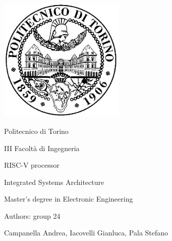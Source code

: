 \documentclass[10pt,  english, makeidx, a4paper, titlepage, oneside]{article}
\begin{document}
	\begin{titlepage}
		\vspace{2cm}
		\centerline{
		\includegraphics[width=6cm]{./images/logopoli}}
		\bigskip
		\centerline{\LARGE Politecnico di Torino}
		\bigskip
		\centerline{\Large III Facolt\`a di Ingegneria}
		\vspace{4cm}
		\centerline{\Huge\sf RISC-V processor}
		\bigskip
		\centerline{\LARGE\sf Integrated Systems Architecture}
		\vspace{2cm}
		\centerline{\LARGE Master's degree in Electronic Engineering}
		\vspace{3cm}
		\centerline{\Large Authors: group 24}
		\vspace{2cm}
		\centerline{\large Campanella Andrea, Iacovelli Gianluca, Pala Stefano}
		\vspace{0.5cm}

	\end{titlepage}

	\tableofcontents
	\hypersetup{linkcolor=blue}
	\newpage


	\lstset{language=VHDL}

	
\end{document}
